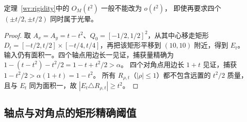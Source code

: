 \begin{proposition}[近矩形误差阶不可提高]\label{wr:sharpness}
定理~\ref{wr:rigidity}中的 $O_M(t^2)$ 一般不能改为 $o(t^2)$，
即使再要求四个 $(\pm t/2,\pm t/2)$ 同时属于光晕。
\end{proposition}
\begin{proof}
取 $A_x=A_y=t-t^2$、$Q_0=[-1/2,1/2]^2$，从其中心移走矩形
$D_t=[-t/2,t/2]\times[-t/4,t/4]$，再把该矩形平移到 $(10,10)$ 附近，得到 $E_t$。
输入仍有面积一。四个轴点用边长一见证，捕获量精确为
$1-(t-t^2)-t^2/2=1-t+t^2/2>\alpha$。
四个对角点用边长 $1+t$ 见证，捕获 $1-t^2/2>\alpha(1+t)=1-t^2$。
所有 $R_{\rho,t}$（$|\rho|\le1$）都不包含远置的 $t^2/2$ 质量，
且与 $E_t$ 同为面积一，故 $|E_t\triangle R_{\rho,t}|\ge t^2$。
\end{proof}

\subsection{轴点与对角点的矩形精确阈值}


